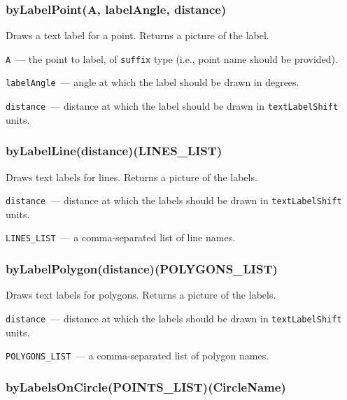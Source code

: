 
\subsubsection{byLabelPoint(A, labelAngle, distance)}\label{byLabelPoint}
Draws a text label for a point. Returns a picture of the label.
	
	\texttt{A}~— the point to label, of \texttt{suffix} type (i.e., point name should be provided).
	
	\texttt{labelAngle}~— angle at which the label should be drawn in degrees.
	
	\texttt{distance}~— distance at which the label should be drawn in \texttt{textLabelShift} units.

\subsubsection{byLabelLine(distance)(LINES\_LIST)}\label{byLabelLine}
	
	Draws text labels for lines. Returns a picture of the labels.
	
	\texttt{distance}~— distance at which the labels should be drawn in \texttt{textLabelShift} units.
	
	\texttt{LINES\_LIST}~— a comma-separated list of line names.

\subsubsection{byLabelPolygon(distance)(POLYGONS\_LIST)}\label{byLabelPolygon}
	
	Draws text labels for polygons. Returns a picture of the labels.
	
	\texttt{distance}~— distance at which the labels should be drawn in \texttt{textLabelShift} units.
	
	\texttt{POLYGONS\_LIST}~— a comma-separated list of polygon names.


\subsubsection{byLabelsOnCircle(POINTS\_LIST)(CircleName)}\label{byLabelsOnCircle}
	
